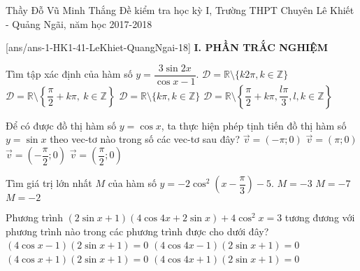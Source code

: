 	\begin{name}
	{Thầy Đỗ Vũ Minh Thắng}
	{Đề kiểm tra học kỳ I, Trường THPT Chuyên Lê Khiết - Quảng Ngãi, năm học 2017-2018}
\end{name}
\setcounter{ex}{0}\setcounter{bt}{0}
[ans/ans-1-HK1-41-LeKhiet-QuangNgai-18]
\noindent\textbf{I. PHẦN TRẮC NGHIỆM}
\begin{ex}%
	Tìm tập xác định của hàm số $y=\dfrac{3\sin2x}{\cos x-1}$.
	\choice
	{\True$\mathscr{D}=\mathbb{R}\setminus \{k2\pi,k\in\mathbb{Z}\}$}
	{$\mathscr{D}=\mathbb{R}\setminus\left\{\dfrac{\pi}{2}+k\pi,\:k\in\mathbb{Z}\right\}$}
	{$\mathscr{D}=\mathbb{R}\setminus\{k\pi,k\in\mathbb{Z}\}$}
	{$\mathscr{D}=\mathbb{R}\setminus\left\{\dfrac{\pi}{2}+k\pi,\dfrac{l\pi}{3},l,k\in\mathbb{Z}\right\}$}
\end{ex}

\begin{ex}%
	Để có được đồ thị hàm số $y=\cos x$, ta thực hiện phép tịnh tiến đồ thị hàm số $y=\sin x$ theo vec-tơ nào trong số các vec-tơ sau đây?
	\choice
	{$\overrightarrow{v}=\left(-\pi;0\right)$}
	{$\overrightarrow{v}=\left(\pi;0\right)$}
	{\True $\overrightarrow{v}=\left(-\dfrac{\pi }{2};0\right)$}
	{$\overrightarrow{v}=\left(\dfrac{\pi }{2};0\right)$}
\end{ex}

\begin{ex}%
	Tìm giá trị lớn nhất $M$ của hàm số $y=-2\cos^2 \left(x-\dfrac{\pi }{3}\right)-5$.
	{$M=-3$}
	{$M=-7$}
	{$M=-2$}
\end{ex}

\begin{ex}%
	Phương trình $\left(2\sin x+1\right)\left(4\cos4x+2\sin x\right)+4\cos^2x=3$ tương đương với phương trình nào trong các phương trình được cho dưới đây?
	\choice
	{$\left(4\cos x-1\right)\left(2\sin x+1\right)=0$}
	{$\left(4\cos4x-1\right)\left(2\sin x+1\right)=0$}
	{$\left(4\cos x+1\right)\left(2\sin x+1\right)=0$}
	{\True $\left(4\cos4x+1\right)\left(2\sin x+1\right)=0$}
\end{ex}

